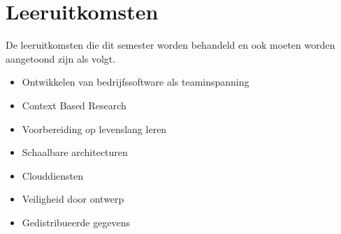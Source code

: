 \chapter{Leeruitkomsten}
\label{ch:learning_outcomes}

De leeruitkomsten die dit semester worden behandeld en ook moeten worden aangetoond zijn als volgt.

\begin{itemize}
	\item Ontwikkelen van bedrijfssoftware als teaminspanning
	\item Context Based Research
	\item Voorbereiding op levenslang leren
	\item Schaalbare architecturen
	\item Clouddiensten
	\item Veiligheid door ontwerp
	\item Gedistribueerde gegevens
\end{itemize}


























\newpage
